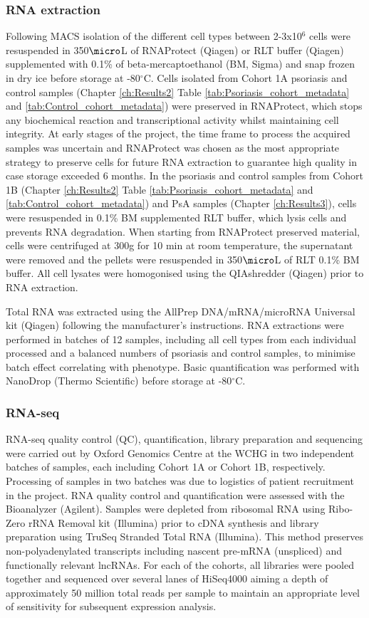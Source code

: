 \subsubsection{RNA extraction}
Following MACS isolation of the different cell types between 2-3x10$^6$ cells were resuspended in 350$\micro$L of RNAProtect (Qiagen) or RLT buffer (Qiagen) supplemented with 0.1\% of beta-mercaptoethanol (BM, Sigma) and snap frozen in dry ice before storage at -80{$^\circ$}C. Cells isolated from Cohort 1A psoriasis and control samples (Chapter \ref{ch:Results2} Table \ref{tab:Psoriasis_cohort_metadata} and \ref{tab:Control_cohort_metadata}) were preserved in RNAProtect, which stops any biochemical reaction and transcriptional activity whilst maintaining cell integrity. At early stages of the project, the time frame to process the acquired samples was uncertain and RNAProtect was chosen as the most appropriate strategy to preserve cells for future RNA extraction to guarantee high quality in case storage exceeded 6 months. In the psoriasis and control samples from Cohort 1B (Chapter \ref{ch:Results2} Table \ref{tab:Psoriasis_cohort_metadata} and \ref{tab:Control_cohort_metadata}) and PsA samples (Chapter \ref{ch:Results3}), cells were resuspended in 0.1\% BM supplemented RLT buffer, which lysis cells and prevents RNA degradation. When starting from RNAProtect preserved material, cells were centrifuged at 300g for 10 min at room temperature, the supernatant were removed and the pellets were resuspended in 350$\micro$L of RLT 0.1\% BM buffer. All cell lysates were homogonised using the QIAshredder (Qiagen) prior to RNA extraction.

Total RNA was extracted using the AllPrep DNA/mRNA/microRNA Universal kit (Qiagen) following the manufacturer's instructions. RNA extractions were performed in batches of 12 samples, including all cell types from each individual processed and a balanced numbers of psoriasis and control samples, to minimise batch effect correlating with phenotype. Basic quantification was performed with NanoDrop (Thermo Scientific) before storage at -80{$^\circ$}C.

\subsubsection{RNA-seq}
RNA-seq quality control (QC), quantification, library preparation and sequencing were carried out by Oxford Genomics Centre at the WCHG in two independent batches of samples, each including Cohort 1A or Cohort 1B, respectively. Processing of samples in two batches was due to logistics of patient recruitment in the project. RNA quality control and quantification were assessed with the Bioanalyzer (Agilent). Samples were depleted from ribosomal RNA using Ribo-Zero rRNA Removal kit (Illumina) prior to cDNA synthesis and library preparation using TruSeq Stranded Total RNA (Illumina). This method preserves non-polyadenylated transcripts including nascent pre-mRNA (unspliced) and functionally relevant lncRNAs. For each of the cohorts, all libraries were pooled together and sequenced over several lanes of HiSeq4000 aiming a depth of approximately 50 million total reads per sample to maintain an appropriate level of sensitivity for subsequent expression analysis.

